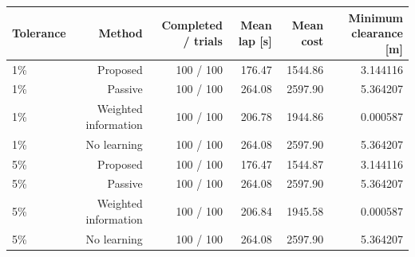 \begin{tabular}{lrrrrr}
\toprule
Tolerance & Method & Completed / trials & Mean lap [s] & Mean cost & Minimum clearance [m] \\
\midrule
1\% & Proposed & 100 / 100 & 176.47 & 1544.86 & 3.144116 \\
1\% & Passive & 100 / 100 & 264.08 & 2597.90 & 5.364207 \\
1\% & Weighted information & 100 / 100 & 206.78 & 1944.86 & 0.000587 \\
1\% & No learning & 100 / 100 & 264.08 & 2597.90 & 5.364207 \\
5\% & Proposed & 100 / 100 & 176.47 & 1544.87 & 3.144116 \\
5\% & Passive & 100 / 100 & 264.08 & 2597.90 & 5.364207 \\
5\% & Weighted information & 100 / 100 & 206.84 & 1945.58 & 0.000587 \\
5\% & No learning & 100 / 100 & 264.08 & 2597.90 & 5.364207 \\
\bottomrule
\end{tabular}
